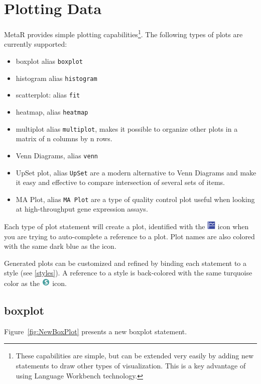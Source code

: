 \section{Plotting Data}
MetaR provides simple plotting capabilities\footnote{These capabilities are simple, but can be extended very easily by adding new statements to draw other types of visualization. This is a key advantage of using Language Workbench technology.}. The following types of plots are currently supported: 
\begin{itemize}
  \item boxplot alias \texttt{boxplot}
  \item histogram alias \texttt{histogram}
  \item scatterplot: alias \texttt{fit}
  \item heatmap, alias \texttt{heatmap}

  \item multiplot alias \texttt{multiplot}, makes it possible to organize other plots in a matrix of n columns by n rows.
  \item Venn Diagrams, alias \texttt{venn}
  \item  UpSet plot, alias \texttt{UpSet} are a modern alternative to Venn Diagrams and make it easy and effective to compare intersection of several sets of items. 
  \item MA Plot, alias \texttt{MA Plot} are a type of quality control plot useful when looking at high-throughput gene expression assays.
\end{itemize}
Each type of plot statement will create a plot, identified with the \includegraphics[height=2ex]{figures/plot.png} icon when you are trying to auto-complete a reference to a plot. Plot names are also colored with the same dark blue as the icon.

Generated plots can be customized and refined by binding each statement to a style (see \ref{styles}). A reference to a style is back-colored with the same turquoise color as the  \includegraphics[height=2ex]{figures/style.png} icon.

\subsection{boxplot}
Figure~\ref{fig:NewBoxPlot} presents a new boxplot statement.

